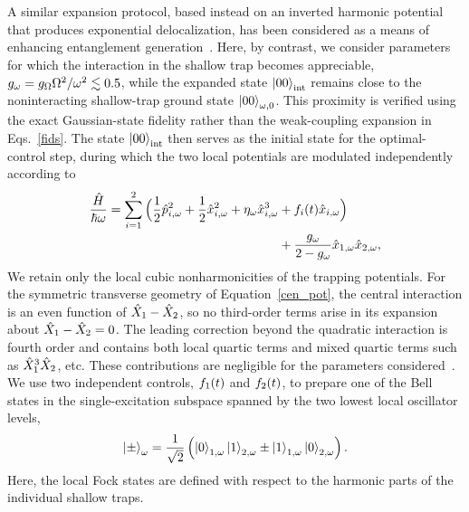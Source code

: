\documentclass[reprint,prx,footinbib,floatfix,twocolumn,longbibliography,superscriptaddress]{revtex4-2}
\begin{document}
A similar expansion protocol, based instead on an inverted harmonic potential that produces exponential delocalization, has been considered as a means of enhancing entanglement generation~\cite{Weiss2021}.
Here, by contrast, we consider parameters for which the interaction in the shallow trap becomes appreciable, $g_{\omega} = g_{\Omega} \Omega^2 / \omega^2 \lesssim 0.5$, while the expanded state $\ket{00}_{\text{int}}$ remains close to the noninteracting shallow-trap ground state $\ket{00}_{\omega,0}$.
This proximity is verified using the exact Gaussian-state fidelity rather than the weak-coupling expansion in Eqs.~\eqref{fids}.
The state $\ket{00}_{\text{int}}$ then serves as the initial state for the optimal-control step, during which the two local potentials are modulated independently according to
\begin{align}
    \frac{\hat{H}}{\hbar \omega} = \sum_{i=1}^2 \Big( \frac{1}{2} \hat{p}_{i,\omega}^2 + \frac{1}{2} \hat{x}_{i,\omega}^2 + \eta_{\omega} \hat{x}_{i, \omega}^3 & + f_i(t)\hat{x}_{i, \omega}  \Big) \nonumber \\ 
    &+ \frac{g_\omega} {2-g_\omega} \hat{x}_{1,\omega}\hat{x}_{2,\omega},
\end{align}
We retain only the local cubic nonharmonicities of the trapping potentials.
For the symmetric transverse geometry of Equation~\eqref{cen_pot}, the central interaction is an even function of $\hat{X}_1 - \hat{X}_2$, so no third-order terms arise in its expansion about $\hat{X}_1 - \hat{X}_2 = 0$.
The leading correction beyond the quadratic interaction is fourth order and contains both local quartic terms and mixed quartic terms such as $\hat{X}_1^3 \hat{X}_2$, etc. These contributions are negligible for the parameters considered~\cite{Ornigotti2025}.
We use two independent controls, $f_1(t)$ and $f_2(t)$, to prepare one of the Bell states in the single-excitation subspace spanned by the two lowest local oscillator levels,
\begin{align}
    \ket{\pm}_\omega = \frac{1}{\sqrt{2}} \left(   \ket{0}_{1,\omega} \ket{1}_{2,\omega} \pm  \ket{1}_{1,\omega} \ket{0}_{2,\omega}  \right).
\end{align}
Here, the local Fock states are defined with respect to the harmonic parts of the individual shallow traps.
\end{document}
